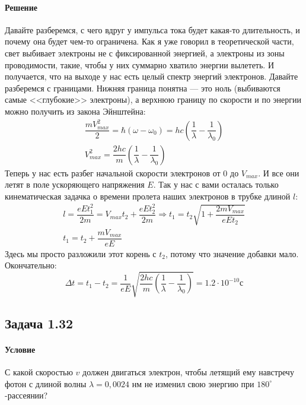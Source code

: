 \documentclass[12pt]{article}
\begin{document}
\paragraph{Решение} Давайте разберемся, с чего вдруг у импульса тока будет какая-то длительность, и почему она будет чем-то ограничена. Как я уже говорил в теоретической части, свет выбивает электроны не с фиксированной энергией, а электроны из зоны проводимости, такие, чтобы у них суммарно хватило энергии вылететь. И получается, что на выходе у нас есть целый спектр энергий электронов. Давайте разберемся с границами. Нижняя граница понятна --- это ноль (выбиваются самые <<глубокие>> электроны), а верхнюю границу по скорости и по энергии можно получить из закона Эйнштейна:
\begin{gather*}
    \dfrac{mV_{max}^2}{2} = \hbar(\omega - \omega_0) = hc\left(\dfrac{1}{\lambda} - \dfrac{1}{\lambda_0} \right)\\
    V^2_{max} = \dfrac{2hc}{m}\left(\dfrac{1}{\lambda} - \dfrac{1}{\lambda_0} \right)
\end{gather*}
Теперь у нас есть разбег начальной скорости электронов от 0 до $V_{max}$. И все они летят в поле ускоряющего напряжения $E$. Так у нас с вами осталась только кинематическая задачка о времени пролета наших электронов в трубке длиной $l$:
\begin{gather*}
    l = \dfrac{eEt_1^2}{2m} = V_{max}t_2 +\dfrac{eEt_2^2}{2m} \Rightarrow t_1 = t_2\sqrt{1+\dfrac{2mV_{max}}{eEt_2}}\\
    t_1 = t_2 + \dfrac{mV_{max}}{eE}
\end{gather*}
Здесь мы просто разложили этот корень с $t_2$, потому что значение добавки мало. Окончательно:
\begin{equation*}
    \Delta t = t_1 - t_2 = \dfrac{1}{eE}\sqrt{\dfrac{2hc}{m}\left(\dfrac{1}{\lambda} - \dfrac{1}{\lambda_0} \right)} = 1.2\cdot10^{-10} \text{с}
\end{equation*}

\subsection{Задача 1.32}
\label{task_132}
\paragraph{Условие} С какой скоростью $v$ должен двигаться электрон, чтобы летящий ему навстречу фотон с длиной волны $\lambda = 0,0024$ нм не изменил свою энергию при $180^\circ$-рассеянии?
\end{document}
